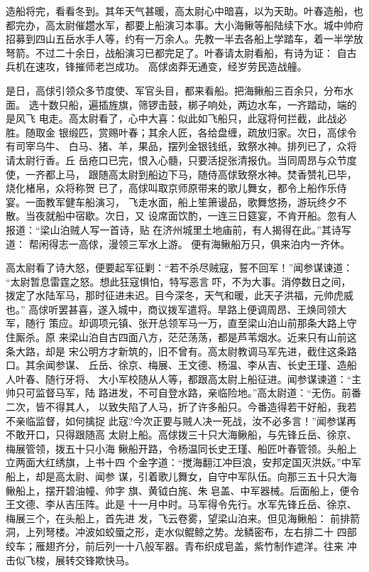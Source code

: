造船将完，看看冬到。其年天气甚暖，高太尉心中暗喜，以为天助。叶春造船，也
都完办，高太尉催趱水军，都要上船演习本事。大小海鳅等船陆续下水。城中帅府
招募到四山五岳水手人等，约有一万余人。先教一半去各船上学踏车，着一半学放
弩箭。不过二十余日，战船演习已都完足了。叶春请太尉看船，有诗为证：
自古兵机在速攻，锋摧师老岂成功。
高俅卤莽无通变，经岁劳民造战艟。

是日，高俅引领众多节度使、军官头目，都来看船。把海鳅船三百余只，分布水面。
选十数只船，遍插旌旗，筛锣击鼓，梆子响处，两边水车，一齐踏动，端的是风飞
电走。高太尉看了，心中大喜：似此如飞船只，此寇将何拦截，此战必胜。随取金
银缎匹，赏赐叶春；其余人匠，各给盘缠，疏放归家。次日，高俅令有司宰乌牛、
白马、猪、羊，果品，摆列金银钱纸，致祭水神。排列已了，众将请太尉行香。丘
岳疮口已完，恨入心髓，只要活捉张清报仇。当同周昂与众节度使，一齐都上马，
跟随高太尉到船边下马，随侍高俅致祭水神。焚香赞礼已毕，烧化楮帛，众将称贺
已了，高俅叫取京师原带来的歌儿舞女，都令上船作乐侍宴。一面教军健车船演习，
飞走水面，船上笙箫谩品，歌舞悠扬，游玩终夕不散。当夜就船中宿歇。次日，又
设席面饮酌，一连三日筵宴，不肯开船。忽有人报道：“梁山泊贼人写一首诗，贴
在济州城里土地庙前，有人揭得在此。”其诗写道：
帮闲得志一高俅，漫领三军水上游。
便有海鳅船万只，俱来泊内一齐休。

高太尉看了诗大怒，便要起军征剿：“若不杀尽贼寇，誓不回军！”闻参谋谏道：
“太尉暂息雷霆之怒。想此狂寇惧怕，特写恶言吓，不为大事。消停数日之间，
拨定了水陆军马，那时征进未迟。目今深冬，天气和暖，此天子洪福，元帅虎威也。”
高俅听罢甚喜，遂入城中，商议拨军遣将。旱路上便调周昂、王焕同领大军，随行
策应。却调项元镇、张开总领军马一万，直至梁山泊山前那条大路上守住厮杀。原
来梁山泊自古四面八方，茫茫荡荡，都是芦苇烟水。近来只有山前这条大路，却是
宋公明方才新筑的，旧不曾有。高太尉教调马军先进，截住这条路口。其余闻参谋、
丘岳、徐京、梅展、王文德、杨温、李从吉、长史王瑾、造船人叶春、随行牙将、
大小军校随从人等，都跟高太尉上船征进。闻参谋谏道：“主帅只可监督马军，陆
路进发，不可自登水路，亲临险地。”高太尉道：“无伤。前番二次，皆不得其人，
以致失陷了人马，折了许多船只。今番造得若干好船，我若不亲临监督，如何擒捉
此寇?今次正要与贼人决一死战，汝不必多言！”闻参谋再不敢开口，只得跟随高
太尉上船。高俅拨三十只大海鳅船，与先锋丘岳、徐京、梅展管领，拨五十只小海
鳅船开路，令杨温同长史王瑾、船匠叶春管领。头船上立两面大红绣旗，上书十四
个金字道：“搅海翻江冲巨浪，安邦定国灭洪妖。”中军船上，却是高太尉、闻参
谋，引着歌儿舞女，自守中军队伍。向那三五十只大海鳅船上，摆开碧油幢、帅字
旗、黄钺白旄、朱皂盖、中军器械。后面船上，便令王文德、李从吉压阵。此是
十一月中时。马军得令先行。水军先锋丘岳、徐京、梅展三个，在头船上，首先进
发，飞云卷雾，望梁山泊来。但见海鳅船：
前排箭洞，上列弩楼。冲波如蛟蜃之形，走水似鲲鲸之势。龙鳞密布，左右排二十
四部绞车；雁翅齐分，前后列一十八般军器。青布织成皂盖，紫竹制作遮洋。往来
冲击似飞梭，展转交锋欺快马。

